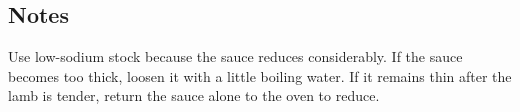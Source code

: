 \subsection{Notes}

Use low-sodium stock because the sauce reduces considerably. If the sauce becomes too thick, loosen it with a little boiling water. If it remains thin after the lamb is tender, return the sauce alone to the oven to reduce.
